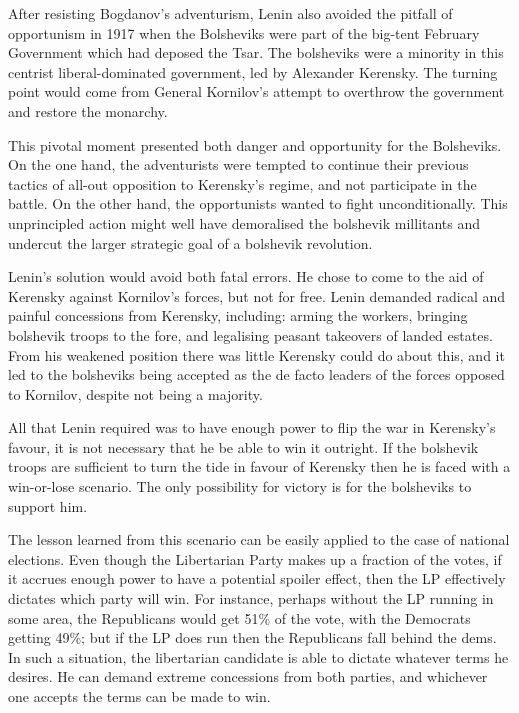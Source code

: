 \documentclass[11pt]{article}
\begin{document}
After resisting Bogdanov's adventurism, Lenin also avoided the pitfall of opportunism in 1917 when the Bolsheviks were part of the big-tent February Government which had deposed the Tsar. The bolsheviks were a minority in this centrist liberal-dominated government, led by Alexander Kerensky. The turning point would come from General Kornilov's attempt to overthrow the government and restore the monarchy.

This pivotal moment presented both danger and opportunity for the Bolsheviks. On the one hand, the adventurists were tempted to continue their previous tactics of all-out opposition to Kerensky's regime, and not participate in the battle. On the other hand, the opportunists wanted to fight unconditionally. This unprincipled action might well have demoralised the bolshevik millitants and undercut the larger strategic goal of a bolshevik revolution.

Lenin's solution would avoid both fatal errors. He chose to come to the aid of Kerensky against Kornilov's forces, but not for free. Lenin demanded radical and painful concessions from Kerensky, including: arming the workers, bringing bolshevik troops to the fore, and legalising peasant takeovers of landed estates. From his weakened position there was little Kerensky could do about this, and it led to the bolsheviks being accepted as the de facto leaders of the forces opposed to Kornilov, despite not being a majority.

All that Lenin required was to have enough power to flip the war in Kerensky's favour, it is not necessary that he be able to win it outright. If the bolshevik troops are sufficient to turn the tide in favour of Kerensky then he is faced with a win-or-lose scenario. The only possibility for victory is for the bolsheviks to support him.

The lesson learned from this scenario can be easily applied to the case of national elections. Even though the Libertarian Party makes up a fraction of the votes, if it accrues enough power to have a potential spoiler effect, then the LP effectively dictates which party will win. For instance, perhaps without the LP running in some area, the Republicans would get 51\% of the vote, with the Democrats getting 49\%; but if the LP does run then the Republicans fall behind the dems. In such a situation, the libertarian candidate is able to dictate whatever terms he desires. He can demand extreme concessions from both parties, and whichever one accepts the terms can be made to win.
\end{document}
